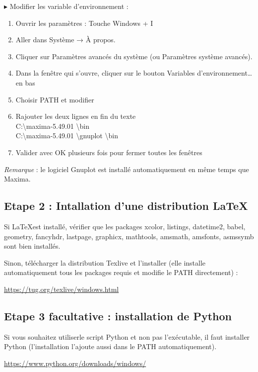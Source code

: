 \documentclass[a4paper, 11pt]{article}
\newcounter{num}
\begin{document}
$\blacktriangleright$ Modifier les variable d'environnement :
\begin{enumerate}
\item Ouvrir les paramètres : Touche Windows + I
\item Aller dans Système → À propos.
\item Cliquer sur Paramètres avancés du système (ou Paramètres système avancés).
\item Dans la fenêtre qui s’ouvre, cliquer sur le bouton Variables d’environnement… en bas
\item Choisir PATH et modifier
\item Rajouter les deux lignes en fin du texte \\
C:\textbackslash maxima-5.49.01 \textbackslash bin \\
C:\textbackslash maxima-5.49.01 \textbackslash gnuplot \textbackslash bin
\item Valider avec OK plusieurs fois pour fermer toutes les fenêtres
\end{enumerate}

\textit{Remarque} : le logiciel Gnuplot est installé automatiquement en même temps que Maxima.

\subsection*{Etape 2 : Intallation d'une distribution \LaTeX{}}
Si \LaTeX est installé, vérifier que les packages  xcolor, listings, datetime2, babel, geometry, fancyhdr, lastpage, graphicx, mathtools, amsmath, amsfonts, asmssymb sont bien installés.

Sinon, télécharger la distribution Texlive et l'installer (elle installe automatiquement tous les packages requis et modifie le PATH directement) :

\begin{center}
\href{https://tug.org/texlive/windows.html}{https://tug.org/texlive/windows.html}
\end{center}

\subsection*{Etape 3 facultative : installation de Python}

Si vous souhaitez utiliserle script Python et non pas l'exécutable, il faut installer Python (l'installation l'ajoute aussi dans le PATH automatiquement).

\begin{center}
\href{https://www.python.org/downloads/windows/}{https://www.python.org/downloads/windows/}
\end{center}
\end{document}
